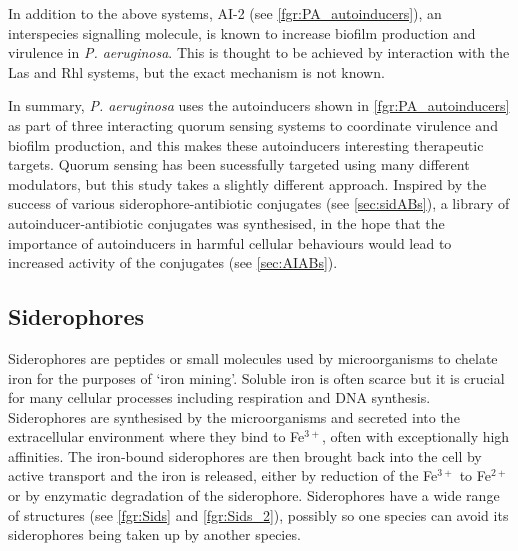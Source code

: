 
In addition to the above systems, AI-2 (see \ref{fgr:PA_autoinducers}), an interspecies signalling molecule\cite{Pereira2013}, is known to increase biofilm production and virulence in \textit{P. aeruginosa}\cite{Li2015a,Li2017}. This is thought to be achieved by interaction with the Las and Rhl systems, but the exact mechanism is not known.

In summary, \textit{P. aeruginosa} uses the autoinducers shown in \ref{fgr:PA_autoinducers} as part of three interacting quorum sensing systems to coordinate virulence and biofilm production, and this makes these autoinducers interesting therapeutic targets. Quorum sensing has been sucessfully targeted using many different modulators\cite{Galloway2011,Hodgkinson2011}, but this study takes a slightly different approach. 
Inspired by the success of various siderophore-antibiotic conjugates (see \ref{sec:sidABs}), a library of autoinducer-antibiotic conjugates was synthesised, in the hope that the importance of autoinducers in harmful cellular behaviours would lead to increased activity of the conjugates (see \ref{sec:AIABs}).


\subsection{Siderophores}

Siderophores are peptides or small molecules used by microorganisms to chelate iron for the purposes of `iron mining'\cite{Hider2010}. Soluble iron is often scarce but it is crucial for many cellular processes including respiration and DNA synthesis. Siderophores are synthesised by the microorganisms and secreted into the extracellular environment where they bind to Fe$^{3+}$, often with exceptionally high affinities. The iron-bound siderophores are then brought back into the cell by active transport and the iron is released, either by reduction of the Fe$^{3+}$ to Fe$^{2+}$ or by enzymatic degradation of the siderophore. Siderophores have a wide range of structures (see \ref{fgr:Sids} and \ref{fgr:Sids_2}), possibly so one species can avoid its siderophores being taken up by another species\cite{Seyedsayamdost2012}.

